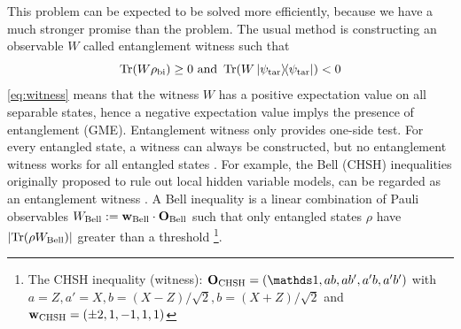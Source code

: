\documentclass[
aps,
pra,
twocolumn,
floatfix,
]{revtex4-2}
\theoremstyle{plain}
\theoremstyle{definition}
\newtheorem{definition}{Definition}
\newtheorem{remark}{Remark}
\newcommand{\ew}{W}
\newcommand{\pob}{O}
\newcommand{\dm}{\rho}
\newcommand{\bi}{\text{bi}}
\newcommand{\target}{\textup{tar}}
\newcommand{\chsh}{\textup{CHSH}}
\newcommand{\bellineq}{\textup{Bell}}
\newcommand{\px}{X}
\newcommand{\pz}{Z}
\begin{document}
This problem can be expected to be solved more efficiently, because we have a much stronger promise than the  problem.
The usual method is constructing an observable $W$ called entanglement witness such that
\begin{equation}
	\Tr(\ew\dm_{\bi}) \ge 0  \text{ and }
	\Tr(\ew\op{\psi_{\target}}) < 0 
	\label{eq:witness}
\end{equation}
\cref{eq:witness} means that the witness $W$ has a positive expectation value on all separable states, hence a negative expectation value implys the presence of entanglement (GME).
Entanglement witness only provides one-side test.
For every entangled state, a witness can always be constructed,
but no entanglement witness works for all entangled states \cite{heinosaariMathematicalLanguageQuantum2011}.
For example, the Bell (CHSH) inequalities originally proposed to rule out local hidden variable models,
can be regarded as an entanglement witness \cite{terhalBellInequalitiesSeparability2000}.
A Bell inequality is a linear combination of Pauli observables $\ew_{\bellineq}:=\vb{w}_{\bellineq}\cdot\vb{\pob}_{\bellineq}$
such that only entangled states $\dm$ have $\abs{\Tr(\dm\ew_{\bellineq})}$ greater than a threshold
\footnote{
	The CHSH inequality (witness):
	$\vb{\pob}_{\chsh}=\qty(\identity, a b, a b', a' b, a' b' )$ with 
	$a = \pz, a' = \px, b = (\px-\pz)/\sqrt{2}, b = (\px+\pz)/\sqrt{2}$
	and $\vb{w}_{\chsh} = \qty(\pm 2, 1, -1, 1, 1)$
}.
\end{document}
